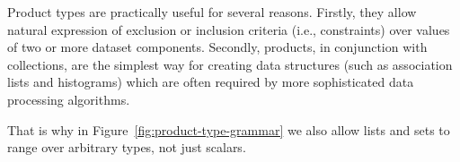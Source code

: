 \documentclass[droidmono,libertine,twoside,user,unofficial]{ecarticle}
\def\<#1>{\synt{#1}}
\begin{document}
Product types are practically useful for several reasons. Firstly,
they allow natural expression of exclusion or inclusion criteria
(i.e., constraints) over values of two or more dataset components.
Secondly, products, in conjunction with collections, are the simplest
way for creating data structures (such as association lists and
histograms) which are often required by more sophisticated data
processing algorithms.

That is why in Figure~\ref{fig:product-type-grammar}
we also allow lists and sets to range over arbitrary types, not just
scalars.






\end{document}

